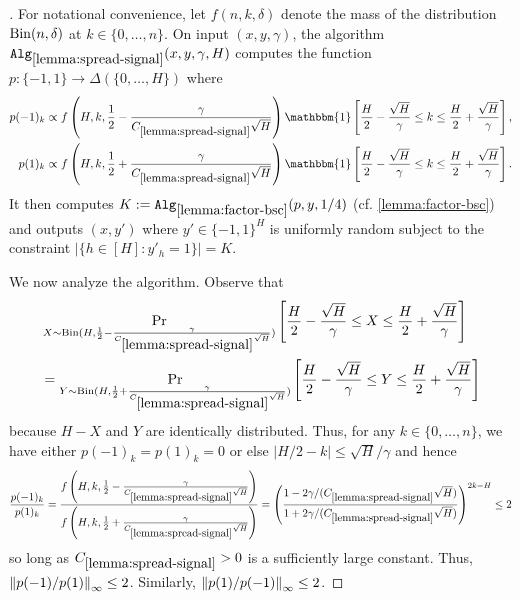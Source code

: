 \begin{proof}[]
For notational convenience, let $f(n,k,\delta)$ denote the mass of the distribution $\operatorname{Bin}(n,\delta)$ at $k \in \{0,\dots,n\}$.  On input $(x,y,\gamma)$, the algorithm $\texttt{Alg}_{\ref{lemma:spread-signal}}(x,y,\gamma,H)$ computes the function $p: \{-1,1\} \to \Delta(\{0,\dots,H\})$ where 
\begin{align}
p(-1)_k &\propto f\left(H, k, \frac{1}{2}-\frac{\gamma}{C_{\ref{lemma:spread-signal}}\sqrt{H}}\right) \mathbbm{1}\left[\frac{H}{2} - \frac{\sqrt{H}}{\gamma} \leq k \leq \frac{H}{2} + \frac{\sqrt{H}}{\gamma}\right], \\ 
p(1)_k &\propto f\left(H, k, \frac{1}{2}+\frac{\gamma}{C_{\ref{lemma:spread-signal}}\sqrt{H}}\right) \mathbbm{1}\left[\frac{H}{2} - \frac{\sqrt{H}}{\gamma} \leq k \leq \frac{H}{2} + \frac{\sqrt{H}}{\gamma}\right].
\end{align}
It then computes $K := \texttt{Alg}_{\ref{lemma:factor-bsc}}(p, y, 1/4)$ (cf. \cref{lemma:factor-bsc}) and outputs $(x,y')$ where $y' \in \{-1,1\}^H$ is uniformly random subject to the constraint $|\{h \in [H]: y'_h = 1\}| = K$.

We now analyze the algorithm. Observe that 
\begin{align}
&\operatorname*{Pr}_{X \sim \operatorname{Bin}(H, \frac{1}{2}-\frac{\gamma}{C_{\ref{lemma:spread-signal}}\sqrt{H}})}\left[\frac{H}{2} - \frac{\sqrt{H}}{\gamma} \leq X \leq \frac{H}{2} + \frac{\sqrt{H}}{\gamma}\right] \\
&= \operatorname*{Pr}_{Y \sim \operatorname{Bin}(H, \frac{1}{2}+\frac{\gamma}{C_{\ref{lemma:spread-signal}}\sqrt{H}})}\left[\frac{H}{2} - \frac{\sqrt{H}}{\gamma} \leq Y \leq \frac{H}{2} + \frac{\sqrt{H}}{\gamma}\right]
\end{align}
because $H-X$ and $Y$ are identically distributed. Thus, for any $k \in \{0,\dots,n\}$, we have either $p(-1)_k = p(1)_k = 0$ or else $|H/2 - k| \leq \sqrt{H}/\gamma$ and hence
\[\frac{p(-1)_k}{p(1)_k} = \frac{f\left(H, k, \frac{1}{2}-\frac{\gamma}{C_{\ref{lemma:spread-signal}}\sqrt{H}}\right)}{f\left(H, k, \frac{1}{2}+\frac{\gamma}{C_{\ref{lemma:spread-signal}}\sqrt{H}}\right)} = \left(\frac{1-2\gamma/(C_{\ref{lemma:spread-signal}}\sqrt{H})}{1+2\gamma/(C_{\ref{lemma:spread-signal}}\sqrt{H})}\right)^{2k-H} \leq 2\]
so long as $C_{\ref{lemma:spread-signal}}>0$ is a sufficiently large constant. Thus, $\left \lVert p(-1)/p(1) \right \rVert_\infty \leq 2$. Similarly, $\left \lVert p(1)/p(-1) \right \rVert_\infty \leq 2$. 


\end{proof}
